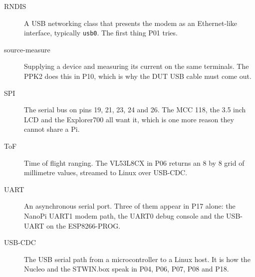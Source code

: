 \begin{description}
\item[RNDIS] A USB networking class that presents the modem as an Ethernet-like interface, typically \texttt{usb0}. The first thing P01 tries.
\item[source-measure] Supplying a device and measuring its current on the same terminals. The PPK2 does this in P10, which is why the DUT USB cable must come out.
\item[SPI] The serial bus on pins 19, 21, 23, 24 and 26. The MCC 118, the 3.5 inch LCD and the Explorer700 all want it, which is one more reason they cannot share a Pi.
\item[ToF] Time of flight ranging. The VL53L8CX in P06 returns an 8 by 8 grid of millimetre values, streamed to Linux over USB-CDC.
\item[UART] An asynchronous serial port. Three of them appear in P17 alone: the NanoPi UART1 modem path, the UART0 debug console and the USB-UART on the ESP8266-PROG.
\item[USB-CDC] The USB serial path from a microcontroller to a Linux host. It is how the Nucleo and the STWIN.box speak in P04, P06, P07, P08 and P18.
\end{description}

